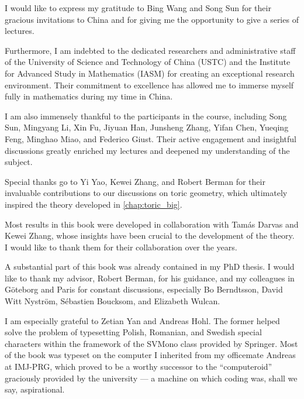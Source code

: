 


I would like to express my gratitude to Bing Wang and Song Sun for their gracious invitations to China and for giving me the opportunity to give a series of lectures.

Furthermore, I am indebted to the dedicated researchers and administrative staff of the University of Science and Technology of China (USTC) and the Institute for Advanced Study in Mathematics (IASM) for creating an exceptional research environment. Their commitment to excellence has allowed me to immerse myself fully in mathematics during my time in China.

I am also immensely thankful to the participants in the course, including Song Sun, Mingyang Li, Xin Fu, Jiyuan Han, Junsheng Zhang, Yifan Chen, Yueqing Feng, Minghao Miao, and Federico Giust. Their active engagement and insightful discussions greatly enriched my lectures and deepened my understanding of the subject.

Special thanks go to Yi Yao, Kewei Zhang, and Robert Berman for their invaluable contributions to our discussions on toric geometry, which ultimately inspired the theory developed in \cref{chap:toric_big}.

Most results in this book were developed in collaboration with Tam\'as Darvas and Kewei Zhang, whose insights have been crucial to the development of the theory.
I would like to thank them for their collaboration over the years.

A substantial part of this book was already contained in my PhD thesis. I would like to thank my advisor, Robert Berman, for his guidance, and my colleagues in Göteborg and Paris for constant discussions, especially Bo Berndtsson, David Witt Nystr\"om, Sébastien Boucksom, and Elizabeth Wulcan.

I am especially grateful to Zetian Yan and Andreas Hohl. The former helped solve the problem of typesetting Polish, Romanian, and Swedish special characters within the framework of the SVMono class provided by Springer. Most of the book was typeset on the computer I inherited from my officemate Andreas at IMJ-PRG, which proved to be a worthy successor to the ``computeroid'' graciously provided by the university --- a machine on which coding was, shall we say, aspirational.

